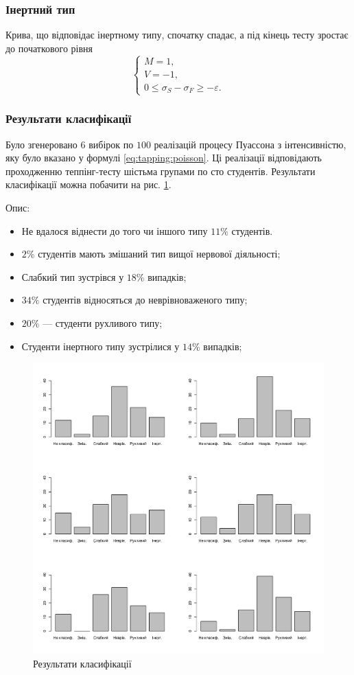 \subsubsection{Інертний тип}
Крива, що відповідає інертному типу, спочатку спадає,
а під кінець тесту зростає до початкового рівня
\begin{equation*}
  \begin{cases}
    M = 1, \\
    V = -1, \\
    0 \le \sigma_S - \sigma_F \ge -\varepsilon.
  \end{cases}
\end{equation*}

\subsubsection{Результати класифікації}
Було згенеровано $6$ вибірок по $100$ реалізацій процесу Пуассона з
інтенсивністю, яку було вказано у формулі \eqref{eq:tapping:poisson}.
Ці реалізації відповідають проходженню теппінг-тесту шістьма групами по сто
студентів.
Результати класифікації можна побачити на рис. \ref{fig:tapping:poisson:types}.

Опис:
\begin{itemize}
  \item
    Не вдалося віднести до того чи іншого типу $11\%$ студентів.
  \item
    $2\%$ студентів мають змішаний тип вищої нервової діяльності;
  \item
    Слабкий тип зустрівся у $18\%$ випадків;
  \item
    $34\%$ студентів відносяться до неврівноваженого типу;
  \item
    $20\%$ --- студенти рухливого типу;
  \item
    Студенти інертного типу зустрілися у $14\%$ випадків;
\end{itemize}

\begin{figure}[h!]
  \centering
  \includegraphics[width=\textwidth]{images/poisson_types}
  \caption{Результати класифікації}
  \label{fig:tapping:poisson:types}
\end{figure}

